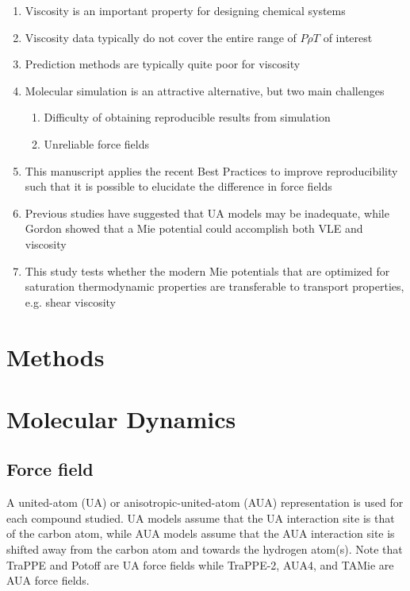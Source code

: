\documentclass[preprint,review,12pt]{elsarticle}
\begin{document}
	\begin{enumerate}
		\item Viscosity is an important property for designing chemical systems
		\item Viscosity data typically do not cover the entire range of $P \rho T$ of interest
		\item Prediction methods are typically quite poor for viscosity
		\item Molecular simulation is an attractive alternative, but two main challenges
		\begin{enumerate}
			\item Difficulty of obtaining reproducible results from simulation
			\item Unreliable force fields
		\end{enumerate}
		\item This manuscript applies the recent Best Practices to improve reproducibility such that it is possible to elucidate the difference in force fields
		\item Previous studies have suggested that UA models may be inadequate, while Gordon showed that a Mie potential could accomplish both VLE and viscosity
		\item This study tests whether the modern Mie potentials that are optimized for saturation thermodynamic properties are transferable to transport properties, e.g. shear viscosity
	\end{enumerate}
	
	\section{Methods}
	
	\section{Molecular Dynamics} \label{Methods I}
	
	\subsection{Force field} \label{Force Field}
	
	A united-atom (UA) or anisotropic-united-atom (AUA) representation is used for each compound studied. UA models assume that the UA interaction site is that of the carbon atom, while AUA models assume that the AUA interaction site is shifted away from the carbon atom and towards the hydrogen atom(s). Note that TraPPE and Potoff are UA force fields while TraPPE-2, AUA4, and TAMie are AUA force fields.
	
\end{document}
